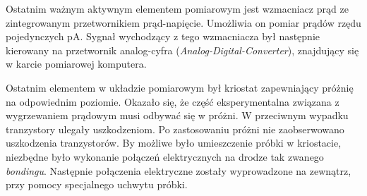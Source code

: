 	Ostatnim ważnym aktywnym elementem pomiarowym jest wzmacniacz prąd ze zintegrowanym przetwornikiem 
	prąd-napięcie. Umożliwia on pomiar prądów rzędu pojedynczych pA. Sygnał wychodzący z tego wzmacniacza
	był następnie kierowany na przetwornik analog-cyfra (\textit{Analog-Digital-Converter}), znajdujący się
	w karcie pomiarowej komputera.

	Ostatnim elementem w układzie pomiarowym był kriostat zapewniający próżnię na odpowiednim poziomie. Okazało się,
	że część eksperymentalna związana z wygrzewaniem prądowym musi odbywać się w próżni. W przeciwnym wypadku
	tranzystory ulegały uszkodzeniom. Po zastosowaniu próżni nie zaobserwowano uszkodzenia tranzystorów. 
	By możliwe było umieszczenie próbki w kriostacie, niezbędne było wykonanie połączeń elektrycznych na drodze
	tak zwanego \textit{bondingu}. Następnie połączenia elektryczne zostały wyprowadzone na zewnątrz, przy pomocy 
	specjalnego uchwytu próbki. 




